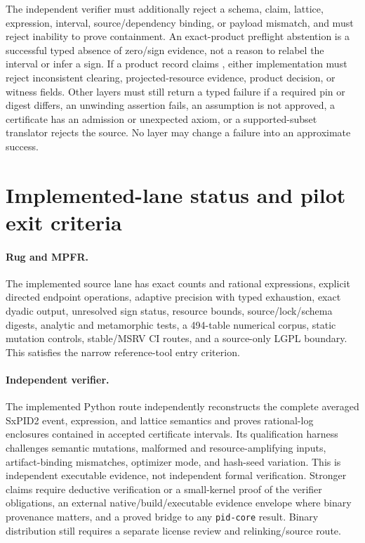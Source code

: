 \documentclass[11pt]{article}
\begin{document}
The independent verifier must additionally reject a schema, claim, lattice, expression, interval,
source/dependency binding, or payload mismatch, and must reject inability to prove containment.
An exact-product preflight abstention is a successful typed absence of zero/sign evidence, not a
reason to relabel the interval or infer a sign.  If a product record claims , either
implementation must reject inconsistent clearing, projected-resource evidence, product decision,
or witness fields.
Other layers must still return a typed failure if a required pin or digest differs, an unwinding
assertion fails, an assumption is not approved, a certificate has an admission or unexpected
axiom, or a supported-subset translator rejects the source.  No layer may change a failure into an
approximate success.

\section{Implemented-lane status and pilot exit criteria}

\paragraph{Rug and MPFR.}
The implemented source lane has exact counts and rational expressions, explicit directed endpoint
operations, adaptive precision with typed exhaustion, exact dyadic output, unresolved sign status,
resource bounds, source/lock/schema digests, analytic and metamorphic tests, a 494-table numerical
corpus, static mutation controls, stable/MSRV CI routes, and a source-only LGPL boundary.  This
satisfies the narrow reference-tool entry criterion.

\paragraph{Independent verifier.}
The implemented Python route independently reconstructs the complete averaged SxPID2 event,
expression, and lattice semantics and proves rational-log enclosures contained in accepted
certificate intervals.  Its qualification harness challenges semantic mutations, malformed and
resource-amplifying inputs, artifact-binding mismatches, optimizer mode, and hash-seed variation.
This is independent executable evidence, not independent formal verification.  Stronger claims
require deductive verification or a small-kernel proof of the verifier obligations, an external
native/build/executable evidence envelope where binary provenance matters, and a proved bridge to
any \texttt{pid-core} result.  Binary distribution still requires a separate license review and
relinking/source route.
\end{document}
